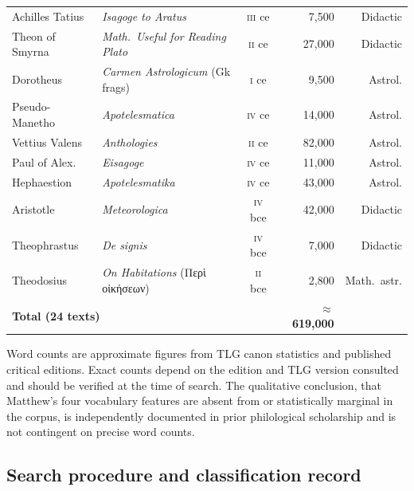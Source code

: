 \documentclass[11pt,a4paper]{article}
\newcommand{\grk}[1]{{\fontencoding{LGR}\selectfont #1}}
\newcommand{\grk}[1]{{\greekfont #1}}
\begin{document}
\begin{table}[h]
\begin{tabular}{@{}lp{5cm}crr@{}}
Achilles Tatius  & \textit{Isagoge to Aratus}                  & \textsc{iii} ce &   7,500 & Didactic \\
Theon of Smyrna  & \textit{Math.\ Useful for Reading Plato}   & \textsc{ii} ce  &  27,000 & Didactic \\
Dorotheus        & \textit{Carmen Astrologicum} (Gk frags)     & \textsc{i} ce   &   9,500 & Astrol. \\
Pseudo-Manetho   & \textit{Apotelesmatica}                     & \textsc{iv} ce  &  14,000 & Astrol. \\
Vettius Valens   & \textit{Anthologies}                        & \textsc{ii} ce  &  82,000 & Astrol. \\
Paul of Alex. & \textit{Eisagoge}                           & \textsc{iv} ce  &  11,000 & Astrol. \\
Hephaestion      & \textit{Apotelesmatika}                     & \textsc{iv} ce  &  43,000 & Astrol. \\
Aristotle        & \textit{Meteorologica}                      & \textsc{iv} bce &  42,000 & Didactic \\
Theophrastus     & \textit{De signis}                          & \textsc{iv} bce &   7,000 & Didactic \\
Theodosius       & \textit{On Habitations} (\grk{Περὶ οἰκήσεων})    & \textsc{ii} bce &   2,800 & Math.~astr. \\
\midrule
\multicolumn{3}{l}{\textbf{Total (24 texts)}} & \textbf{$\approx$619,000} & \\
\bottomrule
\end{tabular}
\smallskip\par
{\small Word counts are approximate figures from TLG canon statistics and
published critical editions. Exact counts depend on the edition and TLG
version consulted and should be verified at the time of search. The
qualitative conclusion, that Matthew's four vocabulary features are absent
from or statistically marginal in the corpus, is independently documented
in prior philological scholarship and is not contingent on precise
word counts.}
\end{table}

\subsection{Search procedure and classification record}\label{subsec:search}
\end{document}
